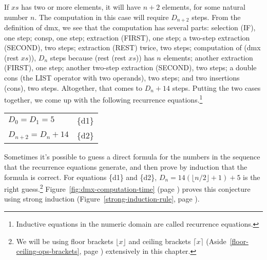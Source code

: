 If $xs$ has two or more elements, it will have $n+2$ elements,
for some natural number $n$.
The computation in this case will require $D_{n+2}$ steps.
From the definition of dmx, we see that the computation
has several parts:
selection (IF), one step;
consp, one step;
extraction (FIRST), one step;
a two-step extraction (SECOND), two steps;
extraction (REST) twice, two steps;
computation of (dmx (rest $xs$)),
$D_n$ steps because (rest (rest $xs$)) has $n$ elements;
another extraction (FIRST), one step;
another two-step extraction (SECOND), two steps;
a double cons (the LIST operator with two operands), two steps; and
two insertions (cons), two steps.
Altogether, that comes to $D_n + 14$ steps.
Putting the two cases together,
we come up with the following recurrence equations.\footnote{Inductive
equations in the numeric domain are called
\label{def:recurrence-equations} recurrence equations.}
\begin{center}
\begin{tabular}{ll}
  $D_0 = D_1 = 5$      & \{d1\} \\
  $D_{n+2} = D_n + 14$ & \{d2\} \\
\end{tabular}
\end{center}

Sometimes it's possible to guess a direct formula for the numbers in the
sequence that the recurrence equations generate,
and then prove by induction
that the formula is correct.
For equations \{d1\} and \{d2\},
$D_{n} = 14(\lfloor n/2\rfloor + 1) + 5$ is the right guess.\footnote{We
will be using floor brackets $\lfloor x\rfloor$ and ceiling brackets $\lceil x\rceil$
(Aside~\ref{floor-ceiling-ops-brackets}, page \pageref{floor-ceiling-ops-brackets})
extensively in this chapter.}
Figure~\ref{fig:dmx-computation-time}
(page \pageref{fig:dmx-computation-time}) proves
this conjecture using strong induction
(Figure~\ref{strong-induction-rule}, page \pageref{strong-induction-rule}).

